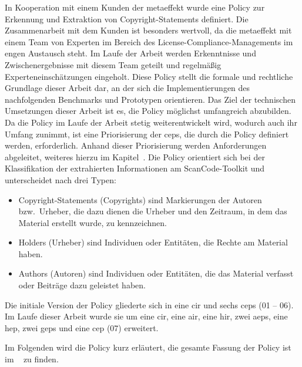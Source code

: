 In Kooperation mit einem Kunden der metaeffekt wurde eine Policy zur Erkennung und Extraktion von Copyright-Statements definiert.
Die Zusammenarbeit mit dem Kunden ist besonders wertvoll, da die metaeffekt mit einem Team von Experten im Bereich des License-Compliance-Managements im engen Austausch steht.
Im Laufe der Arbeit werden Erkenntnisse und Zwischenergebnisse mit diesem Team geteilt und regelmäßig Experteneinschätzungen eingeholt.
Diese Policy stellt die formale und rechtliche Grundlage dieser Arbeit dar, an der sich die Implementierungen des nachfolgenden Benchmarks und Prototypen orientieren.
Das Ziel der technischen Umsetzungen dieser Arbeit ist es, die Policy möglichst umfangreich abzubilden.
Da die Policy im Laufe der Arbeit stetig weiterentwickelt wird, wodurch auch ihr Umfang zunimmt, ist eine Priorisierung der \glspl{cep}, die durch die Policy definiert werden, erforderlich.
Anhand dieser Priorisierung werden Anforderungen abgeleitet, weiteres hierzu im Kapitel~.
Die Policy orientiert sich bei der Klassifikation der extrahierten Informationen am ScanCode-Toolkit und unterscheidet nach drei Typen:
\begin{itemize}
    \item Copyright-Statements (Copyrights) sind Markierungen der Autoren bzw.\ Urheber, die dazu dienen die Urheber und den Zeitraum, in dem das Material erstellt wurde, zu kennzeichnen.
    \item Holders (Urheber) sind Individuen oder Entitäten, die Rechte am Material haben.
    \item Authors (Autoren) sind Individuen oder Entitäten, die das Material verfasst oder Beiträge dazu geleistet haben.
\end{itemize}

Die initiale Version der Policy gliederte sich in eine \gls{cir} und sechs \glspl{cep} (01 -- 06).
Im Laufe dieser Arbeit wurde sie um eine \gls{cir}, eine \gls{air}, eine \gls{hir}, zwei \glspl{aep}, eine \gls{hep}, zwei \glspl{gep} und eine \gls{cep} (07) erweitert.

Im Folgenden wird die Policy kurz erläutert, die gesamte Fassung der Policy ist im ~ zu finden.


